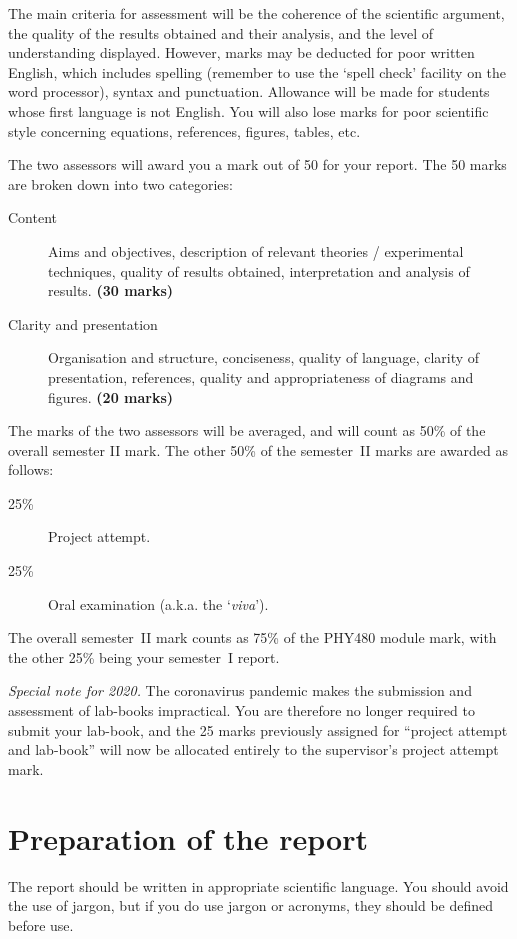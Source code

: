 \documentclass[aps,pra,twocolumn]{revtex4-2}
\begin{document}
The main criteria for assessment will be the coherence of the scientific argument, the quality of the results obtained and their analysis, and the level of understanding displayed. However, marks may be deducted for poor written English, which  includes spelling (remember to use the `spell check' facility on the word processor), syntax and punctuation. Allowance will be made for students whose first language is not English. You will also lose marks for poor scientific style concerning equations, references, figures, tables, etc. 

The two assessors will award you a mark out of 50 for your report. The 50 marks are broken down into two categories:
\begin{description}
\item[Content] Aims and objectives, description of relevant theories / experimental techniques, quality of results obtained, interpretation and analysis of results.
 \textbf{(30 marks)}
\item[Clarity and presentation] Organisation and structure, conciseness, quality of language, clarity of presentation, references, quality and appropriateness of diagrams and figures.
 \textbf{(20 marks)}
\end{description}
The marks of the two assessors will be averaged, and will count as 50\% of the overall semester II mark. The other 50\% of the semester~II marks are awarded as follows:
\begin{description}
\item[25\%] Project attempt.
\item[25\%] Oral examination (a.k.a. the `\textit{viva}').
\end{description}
The overall semester~II mark counts as 75\% of the PHY480 module mark, with the other 25\% being your semester~I report. 

\textit{Special note for 2020.} The coronavirus pandemic makes the submission and assessment of lab-books impractical. You are therefore no longer required to submit your lab-book, and the 25 marks previously assigned for ``project attempt and lab-book'' will now be allocated entirely to the supervisor's project attempt mark.








\section{Preparation of the report}
The report should be written in appropriate scientific language. You should avoid the use of jargon, but if you do use jargon or acronyms, they should be defined before use.  
\end{document}
